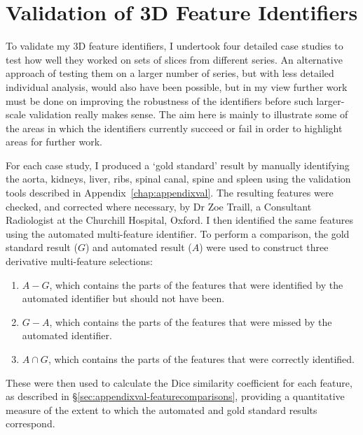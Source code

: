 
\section{Validation of 3D Feature Identifiers}

To validate my 3D feature identifiers, I undertook four detailed case studies to test how well they worked on sets of slices from different series. An alternative approach of testing them on a larger number of series, but with less detailed individual analysis, would also have been possible, but in my view further work must be done on improving the robustness of the identifiers before such larger-scale validation really makes sense. The aim here is mainly to illustrate some of the areas in which the identifiers currently succeed or fail in order to highlight areas for further work.

For each case study, I produced a `gold standard' result by manually identifying the aorta, kidneys, liver, ribs, spinal canal, spine and spleen using the validation tools described in Appendix~\ref{chap:appendixval}. The resulting features were checked, and corrected where necessary, by Dr Zoe Traill, a Consultant Radiologist at the Churchill Hospital, Oxford. I then identified the same features using the automated multi-feature identifier. To perform a comparison, the gold standard result ($G$) and automated result ($A$) were used to construct three derivative multi-feature selections:
%
\begin{enumerate}
\item $A - G$, which contains the parts of the features that were identified by the automated identifier but should not have been.
\item $G - A$, which contains the parts of the features that were missed by the automated identifier.
\item $A \cap G$, which contains the parts of the features that were correctly identified.
\end{enumerate}
%
These were then used to calculate the Dice similarity coefficient for each feature, as described in \S\ref{sec:appendixval-featurecomparisons}, providing a quantitative measure of the extent to which the automated and gold standard results correspond.

